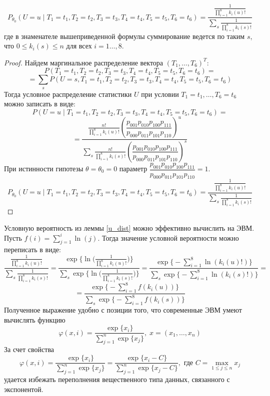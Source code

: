 \begin{lemma}\label{u_dist}
    $$P_{\theta_0}(U=u \mid T_1=t_1, T_2=t_2, T_3=t_3, T_4=t_4, T_5=t_5, T_6=t_6)=\dfrac{\frac{1}{\prod_{i=1}^8 k_i(u)!}}
        {\sum_{s} \frac{1}{\prod_{i=1}^8 k_i(s)!}}$$
    где в знаменателе вышеприведенной формулы суммирование ведется по таким $s$, что $0\leq k_i(s) \leq n$ для всех $i=1\ldots,8$.
\end{lemma}
\begin{proof}
    Найдем маргинальное распределение вектора $(T_1,\ldots,T_6)^T$:
    $$P(T_1=t_1, T_2=t_2, T_3=t_3, T_4=t_4, T_5=t_5, T_6=t_6)=$$
    $$=\sum_{s} P(U=s, T_1=t_1, T_2=t_2, T_3=t_3, T_4=t_4, T_5=t_5, T_6=t_6)$$
    Тогда условное распределение статистики $U$ при условии $T_1=t_1,\ldots,T_6=t_6$ можно записать в виде:
    $$P(U=u \mid T_1=t_1, T_2=t_2, T_3=t_3, T_4=t_4, T_5=t_5, T_6=t_6)=$$
    $$=\dfrac{\frac{n!}{\prod_{i=1}^8 k_i(u)!} \left(\dfrac{p_{001}p_{010}p_{100}p_{111}}{p_{000}p_{011}p_{101}p_{110}}\right)^u}
        {\sum_{s} \frac{n!}{\prod_{i=1}^8 k_i(s)!} \left(\dfrac{p_{001}p_{010}p_{100}p_{111}}{p_{000}p_{011}p_{101}p_{110}}\right)^s}$$
    При истинности гипотезы $\theta=\theta_0=0$ параметр $\dfrac{p_{001}p_{010}p_{100}p_{111}}{p_{000}p_{011}p_{101}p_{110}}=1$.
    $$P_{\theta_0}(U=u \mid T_1=t_1, T_2=t_2, T_3=t_3, T_4=t_4, T_5=t_5, T_6=t_6)=\dfrac{\frac{1}{\prod_{i=1}^8 k_i(u)!}}
        {\sum_{s} \frac{1}{\prod_{i=1}^8 k_i(s)!}}$$
\end{proof}

Условную вероятность из леммы \ref{u_dist} можно эффективно вычислить на ЭВМ.
Пусть $f(i)=\sum_{j=1}^{i} \ln(j)$. Тогда значение условной вероятности можно переписать в виде:
$$
\dfrac{\frac{1}{\prod_{i=1}^8 k_i(u)!}}{\sum_{s} \frac{1}{\prod_{i=1}^8 k_i(s)!}}=
\dfrac{\exp \biggl\{ \ln \biggl( \frac{1}{\prod_{i=1}^8 k_i(u)!} \biggr) \biggr\}}
{\sum_{s} \exp \biggl\{ \ln \biggl( \frac{1}{\prod_{i=1}^8 k_i(s)!} \biggr) \biggr\}}
= \dfrac{\exp \biggl\{ -\sum_{i=1}^8 \ln(k_i(u)!) \biggr\}}{\sum_{s} \exp \biggl\{ -\sum_{i=1}^8 \ln(k_i(s)!) \biggr\}} =
$$
$$
= \dfrac{\exp \biggl\{ -\sum_{i=1}^8 f(k_i(u)) \biggr\}}{\sum_{s} \exp \biggl\{ -\sum_{i=1}^8 f(k_i(s)) \biggr\}}
$$
Полученное выражение удобно с позиции того, что современные ЭВМ умеют вычислять функцию
$$
\varphi(x,i)=\dfrac{\exp\{x_i\}}{\sum_{j=1}^{n} \exp\{x_j\}}, \; x=(x_1,\ldots,x_n)
$$
За счет свойства
$$
\varphi(x,i)=\dfrac{\exp\{x_i\}}{\sum_{j=1}^{n} \exp\{x_j\}} = \dfrac{\exp\{x_i - C\}}{\sum_{j=1}^{n} \exp\{x_j - C\}}
, \text{ где } C=\max_{1\leq j \leq n} x_j
$$
удается избежать переполнения вещественного типа данных, связанного с экспонентой.
